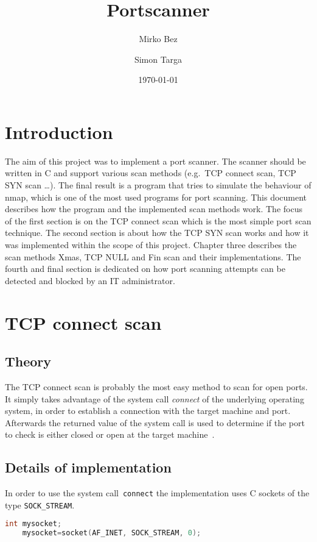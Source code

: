 \documentclass[a4paper]{scrartcl}
\begin{document}
	\title{Portscanner} \author{Mirko Bez \and  Simon Targa} \date{\today} \maketitle
	\tableofcontents
	\newpage

	\section*{Introduction}
	The aim of this project was to implement a port scanner. The scanner should be written in C and support various scan methods (e.g.\ TCP connect scan, TCP SYN scan \dots).
	The final result is a program that tries to simulate the behaviour of nmap, which is one of the most used programs for port scanning. This document
	describes how the program and the implemented scan methods work. The focus of the first section is on the TCP connect scan which is the most simple port scan technique. The second
	section is about how the TCP SYN scan works and how it was implemented within the scope of this project. Chapter three describes the scan methods Xmas, TCP NULL and Fin scan and their
	implementations. The fourth and final section is dedicated on how port scanning attempts can be detected and blocked by an IT administrator.
	
	
	\section{TCP connect scan}
	\subsection{Theory}
	The TCP connect scan is probably the most easy method to scan for open ports. It simply takes advantage of the system call
	\emph{connect} of the underlying operating system, in order to establish a connection with the target machine and port. Afterwards the
	returned value of the system call is used to determine if the port to check is either closed or open at the target machine~\cite{nmap2009}. 
	
	
	\subsection{Details of implementation}
	In order to use the system call~\lstinline{connect} the implementation uses C sockets of the type \lstinline|SOCK_STREAM|. 
	\begin{lstlisting}[frame= single, language=C, caption=Code to create C socket of type \lstinline|SOCK_STREAM|]
	int mysocket;
	mysocket=socket(AF_INET, SOCK_STREAM, 0);
	\end{lstlisting}
	
\end{document}
